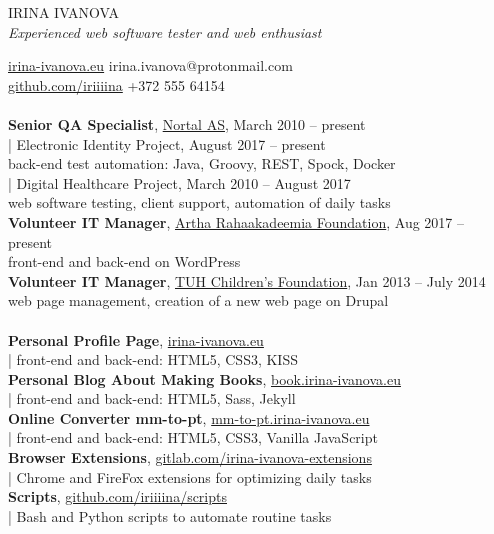 \documentclass[a4paper, 12pt]{article}
\begin{document}
\begin{center}
  {\LARGE{IRINA IVANOVA}}\\
  \textit{Experienced web software tester and web enthusiast}
\end{center}
\href{https://irina-ivanova.eu}{irina-ivanova.eu}
\hspace{5cm}
irina.ivanova@protonmail.com\\
\href{https://github.com/iriiiina}{github.com/iriiiina}
\hspace{4.4cm}
+372 555 64154\\

\\
\textbf{Senior QA Specialist}, \href{https://nortal.com}{Nortal AS}, March 2010 \--- present\\
\indent | Electronic Identity Project, August 2017 \--- present\\
\indent \indent \indent back-end test automation: Java, Groovy, REST, Spock, Docker\\
\indent | Digital Healthcare Project, March 2010 \--- August 2017\\
\indent \indent \indent web software testing, client support, automation of daily tasks\\
\textbf{Volunteer IT Manager}, \href{https://rahaakadeemia.ee}{Artha Rahaakadeemia Foundation}, Aug 2017 \--- present\\
\indent \indent \indent front-end and back-end on WordPress\\
\textbf{Volunteer IT Manager}, \href{https://www.lastefond.ee}{TUH Children's Foundation}, Jan 2013 \--- July 2014\\
\indent \indent \indent web page management, creation of a new web page on Drupal\\

\\
\textbf{Personal Profile Page}, \href{https://irina-ivanova.eu}{irina-ivanova.eu}\\
\indent | front-end and back-end: HTML5, CSS3, KISS\\
\textbf{Personal Blog About Making Books}, \href{https://book.irina-ivanova.eu}{book.irina-ivanova.eu}\\
\indent | front-end and back-end: HTML5, Sass, Jekyll\\
\textbf{Online Converter mm-to-pt}, \href{https://mm-to-pt.irina-ivanova.eu}{mm-to-pt.irina-ivanova.eu}\\
\indent | front-end and back-end: HTML5, CSS3, Vanilla JavaScript\\
\textbf{Browser Extensions}, \href{https://gitlab.com/irina-ivanova-extensions}{gitlab.com/irina-ivanova-extensions}\\
\indent | Chrome and FireFox extensions for optimizing daily tasks\\
\textbf{Scripts}, \href{https://github.com/iriiiina/scripts}{github.com/iriiiina/scripts}\\
\indent | Bash and Python scripts to automate routine tasks\\
\end{document}
